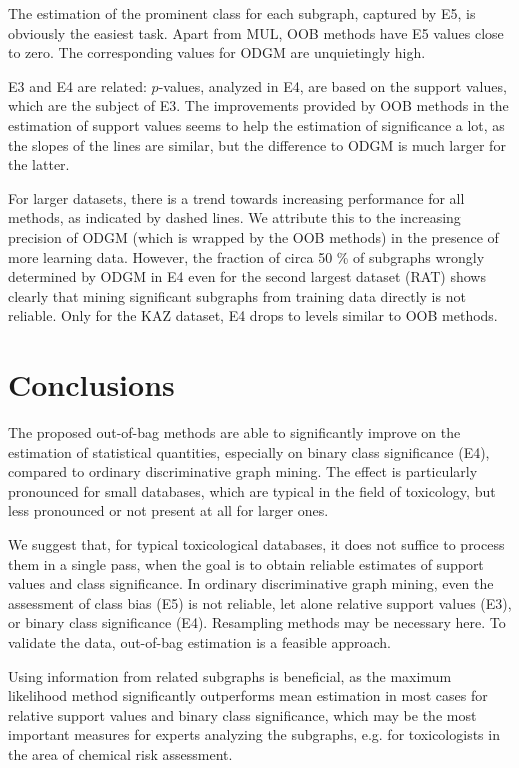 \documentclass{sig-alternate}
\begin{document}
The estimation of the prominent class for each subgraph, captured by E5, is
obviously the easiest task. Apart from MUL, OOB methods have E5 values close to
zero. The corresponding values for ODGM are unquietingly high.

E3 and E4 are related: $p$-values, analyzed in E4, are based on the support
values, which are the subject of E3. The improvements provided by OOB methods
in the estimation of support values seems to help the estimation of
significance a lot, as the slopes of the lines are similar, but the difference
to ODGM is much larger for the latter.

For larger datasets, there is a trend towards increasing performance for all
methods, as indicated by dashed lines.
We attribute this to the increasing precision of ODGM (which is wrapped by the
OOB methods) in the presence of more learning data. However, the fraction of
circa 50 \% of subgraphs wrongly determined by ODGM in E4 even for the second
largest dataset (RAT) shows clearly that mining significant subgraphs from training
data directly is not reliable. Only for the KAZ dataset, E4 drops to levels
similar to OOB methods.

\section{Conclusions}
\label{s:Conclusion}
The proposed out-of-bag methods are able to significantly improve on the estimation of
statistical quantities, especially on binary class significance (E4), compared to ordinary
discriminative graph mining. The effect is particularly pronounced for small
databases, which are typical in the field of toxicology, but less pronounced or not present at all for larger ones. 

We suggest that, for typical toxicological
databases, it does not suffice to process them in a single pass, when the goal
is to obtain reliable estimates of support values and class significance. In
ordinary discriminative graph mining, even the assessment of class bias (E5) is
not reliable, let alone relative support values (E3), or binary class significance (E4).
Resampling methods may be necessary here. To validate
the data, out-of-bag estimation is a feasible approach.

Using information from related subgraphs is beneficial, as the maximum
likelihood method significantly outperforms mean estimation in most cases
for relative support values and binary class significance, which may be the
most important measures for experts analyzing the subgraphs, e.g. for toxicologists 
in the area of chemical risk assessment.




\end{document}
